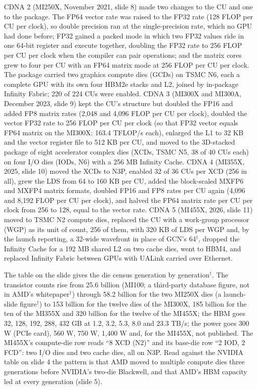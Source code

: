 \documentclass[11pt,letterpaper]{article}
\begin{document}
CDNA 2 (MI250X, November 2021, slide 8) made two changes to the CU and one to the package. The FP64 vector rate was raised to the FP32 rate (128 FLOP per CU per clock), so double precision ran at the single-precision rate, which no GPU had done before; FP32 gained a packed mode in which two FP32 values ride in one 64-bit register and execute together, doubling the FP32 rate to 256 FLOP per CU per clock when the compiler can pair operations; and the matrix cores grew to four per CU with an FP64 matrix mode at 256 FLOP per CU per clock. The package carried two graphics compute dies (GCDs) on TSMC N6, each a complete GPU with its own four HBM2e stacks and L2, joined by in-package Infinity Fabric; 220 of 224 CUs were enabled. CDNA 3 (MI300X and MI300A, December 2023, slide 9) kept the CU's structure but doubled the FP16 and added FP8 matrix rates (2{,}048 and 4{,}096 FLOP per CU per clock), doubled the vector FP32 rate to 256 FLOP per CU per clock (so that FP32 vector equals FP64 matrix on the MI300X: 163.4 TFLOP/s each), enlarged the L1 to 32 KB and the vector register file to 512 KB per CU, and moved to the 3D-stacked package of eight accelerator complex dies (XCDs, TSMC N5, 38 of 40 CUs each) on four I/O dies (IODs, N6) with a 256 MB Infinity Cache. CDNA 4 (MI355X, 2025, slide 10) moved the XCDs to N3P, enabled 32 of 36 CUs per XCD (256 in all), grew the LDS from 64 to 160 KB per CU, added the block-scaled MXFP6 and MXFP4 matrix formats, doubled FP16 and FP8 rates per CU again (4{,}096 and 8{,}192 FLOP per CU per clock), and halved the FP64 matrix rate per CU per clock from 256 to 128, equal to the vector rate. CDNA 5 (MI455X, 2026, slide 11) moved to TSMC N2 compute dies, replaced the CU with a work-group processor (WGP) as its unit of count, 256 of them, with 320 KB of LDS per WGP and, by the launch reporting, a 32-wide wavefront in place of GCN's 64$^\dagger$, dropped the Infinity Cache for a 192 MB shared L2 on two cache dies, went to HBM4, and replaced Infinity Fabric between GPUs with UALink carried over Ethernet.

The table on the slide gives the die census generation by generation$^\dagger$. The transistor counts rise from 25.6 billion (MI100; a third-party database figure, not in AMD's whitepaper$^\dagger$) through 58.2 billion for the two MI250X dies (a launch-slide figure$^\dagger$) to 153 billion for the twelve dies of the MI300X, 185 billion for the ten of the MI355X and 320 billion for the twelve of the MI455X; the HBM goes 32, 128, 192, 288, 432 GB at 1.2, 3.2, 5.3, 8.0 and 23.3 TB/s; the power goes 300 W (PCIe card), 560 W, 750 W, 1{,}400 W and, for the MI455X, not published. The MI455X's compute-die row reads ``8 XCD (N2)'' and its base-die row ``2 IOD, 2 FCD'': two I/O dies and two cache dies, all on N3P. Read against the NVIDIA table on slide 4 the pattern is that AMD moved to multiple compute dies three generations before NVIDIA's two-die Blackwell, and that AMD's HBM capacity led at every generation (slide 5).
\end{document}
